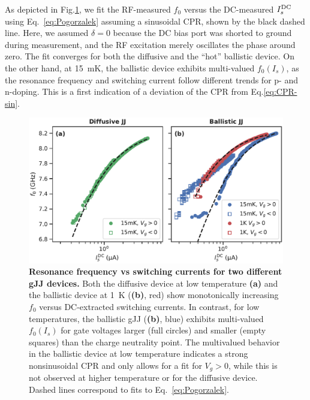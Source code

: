 As depicted in Fig.\ref{fig:figure2}, we fit the RF-measured $f_0$ versus the DC-measured $I_s^{\rm DC}$ using Eq.~\ref{eq:Pogorzalek} assuming a sinusoidal CPR, shown by the black dashed line.
%
Here, we assumed $\delta=0$ because the DC bias port was shorted to ground during measurement, and the RF excitation merely oscillates the phase around zero.
%
The fit converges for both the diffusive and the “hot” ballistic device.
%
On the other hand, at \SI{15}{\milli\kelvin}, the ballistic device exhibits multi-valued $f_0\left(I_s\right)$, as the resonance frequency and switching current follow different trends for p- and n-doping.
%
This is a first indication of a deviation of the CPR from Eq.\ref{eq:CPR-sin}.


\begin{figure}
	\centering
	\includegraphics[width=0.583\linewidth]{chapter-gJJ-CPR/figs/Figure2}
	\caption{
		\textbf{Resonance frequency vs switching currents for two different gJJ devices.}
		Both the diffusive device at low temperature \textbf{(a)} and the ballistic device at \SI{1}{\kelvin} (\textbf{(b)}, red) show monotonically increasing $f_0$ versus DC-extracted switching currents.
		In contrast, for low temperatures, the ballistic gJJ (\textbf{(b)}, blue) exhibits multi-valued $f_0\left(I_s\right)$ for gate voltages larger (full circles) and smaller (empty squares) than the charge neutrality point.
		The	multivalued behavior in the ballistic device at low temperature indicates a strong nonsinusoidal CPR and only allows for a fit for $V_g>0$, while this is not observed at higher temperature or for the diffusive device.
		Dashed lines correspond to fits to Eq.~\ref{eq:Pogorzalek}.
	}
	\label{fig:figure2}
\end{figure}

